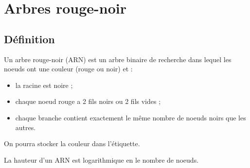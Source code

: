 \documentclass{scrartcl}
\begin{document}
	\section{Arbres rouge-noir}
		\subsection{Définition}
			Un arbre rouge-noir (ARN) est un arbre binaire de recherche dans lequel les noeuds ont une couleur (rouge ou noir) et :
			\begin{itemize}
				\item la racine est noire ;
				\item chaque noeud rouge a 2 fils noirs ou 2 fils vides ;
				\item chaque branche contient exactement le même nombre de noeuds noirs que les autres.
			\end{itemize}
			On pourra stocker la couleur dans l'étiquette.

			\rem La hauteur d'un ARN est logarithmique en le nombre de noeuds.
\end{document}
